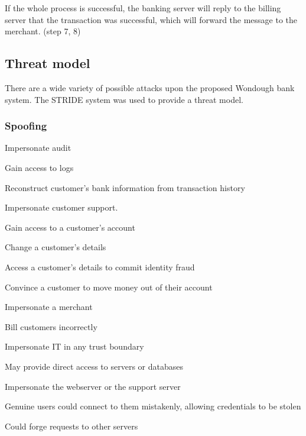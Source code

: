 If the whole process is successful, the banking server will reply to the billing server that the transaction was successful, which will forward the message to the merchant. (step 7, 8)

\subsection{Threat model}

There are a wide variety of possible attacks upon the proposed Wondough bank system. The STRIDE system was used to provide a threat model.

\subsubsection{Spoofing}

\begin{numbered}
    \item \label{impersonateAudit} Impersonate audit
    \begin{numbered}
        \item Gain access to logs
        \item Reconstruct customer's bank information from transaction history
    \end{numbered}
    
    \item \label{impersonateCustomerSupport} Impersonate customer support.
    \begin{numbered}
        \item Gain access to a customer's account
        \item Change a customer's details
        \item Access a customer's details to commit identity fraud
        \item Convince a customer to move money out of their account
    \end{numbered}

    \item \label{impersonateMerchant} Impersonate a merchant
    \begin{numbered}
        \item Bill customers incorrectly
    \end{numbered}

    \item \label{impersonateIt} Impersonate IT in any trust boundary
    \begin{numbered}
        \item May provide direct access to servers or databases
    \end{numbered}

    \item \label{impersonateWebserver} Impersonate the webserver or the support server
    \begin{numbered}
        \item Genuine users could connect to them mistakenly, allowing credentials to be stolen
        \item Could forge requests to other servers
    \end{numbered}
\end{numbered}

